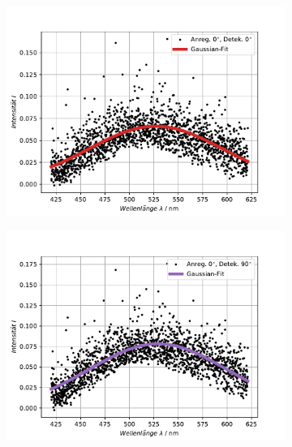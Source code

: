 \begin{figure}[hbtp]
\centering
	\begin{subfigure}[t]{0.45\textwidth}
	\includegraphics[width=\textwidth]{Plots/aufgabe3_P1_korrek.pdf}
	\end{subfigure}
	\begin{subfigure}[t]{0.45\textwidth}
	\includegraphics[width=\textwidth]{Plots/aufgabe3_P2_korrek.pdf}
	\end{subfigure}
	\\
	\begin{subfigure}[t]{0.45\textwidth}

\end{subfigure}
\end{figure}
